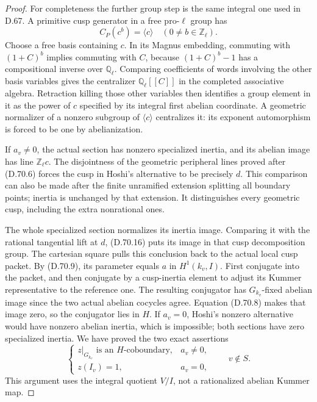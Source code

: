 \begin{proof}
For completeness the further group step is the
same integral one used in D.67. A primitive cusp
generator in a free pro-\(\ell\) group has
\[
 C_P(c^b)=\langle c\rangle
                    \quad(0\ne b\in\mathbb Z_\ell).
                                                        \tag{D.70.16}
\]
Choose a free basis containing \(c\). In its Magnus
embedding, commuting with \((1+C)^b\) implies
commuting with \(C\), because
\((1+C)^b-1\) has a compositional inverse over
\(\mathbb Q_\ell\). Comparing coefficients of
words involving the other basis variables gives
the centralizer \(\mathbb Q_\ell[[C]]\) in the
completed associative algebra. Retraction killing
those other variables then identifies a group
element in it as the power of \(c\) specified by
its integral first abelian coordinate. A geometric
normalizer of a nonzero subgroup of \(\langle c\rangle\)
centralizes it: its exponent automorphism is
forced to be one by abelianization.

If \(a_v\ne0\), the actual section has nonzero
specialized inertia, and its abelian image has
line \(\mathbb Z_\ell c\). The disjointness of
the geometric peripheral lines proved after
(D.70.6) forces the cusp in Hoshi's alternative
to be precisely \(d\). This comparison can also
be made after the finite unramified extension
splitting all boundary points; inertia is
unchanged by that extension. It distinguishes
every geometric cusp, including the extra
nonrational ones.

The whole specialized section normalizes its
inertia image. Comparing it with the rational
tangential lift at \(d\), (D.70.16) puts its
image in that cusp decomposition group.
The cartesian square pulls this conclusion
back to the actual local cusp packet. By
(D.70.9), its parameter equals \(a\) in
\(H^1(k_v,I)\). First conjugate into the
packet, and then conjugate by a cusp-inertia
element to adjust its Kummer representative
to the reference one. The resulting
conjugator has \(G_{k_v}\)-fixed abelian
image since the two actual abelian cocycles
agree. Equation (D.70.8) makes that image
zero, so the conjugator lies in \(H\).
If \(a_v=0\), Hoshi's nonzero alternative
would have nonzero abelian inertia, which
is impossible; both sections have zero
specialized inertia. We have proved the
two exact assertions
\[
 \begin{cases}
 z|_{G_{k_v}}\text{ is an }H\text{-coboundary},
                              &a_v\ne0,\\
 z(I_v)=1,                    &a_v=0,
 \end{cases}\qquad v\notin S.                         \tag{D.70.17}
\]
This argument uses the integral quotient \(V/I\),
not a rationalized abelian Kummer map.


\end{proof}

